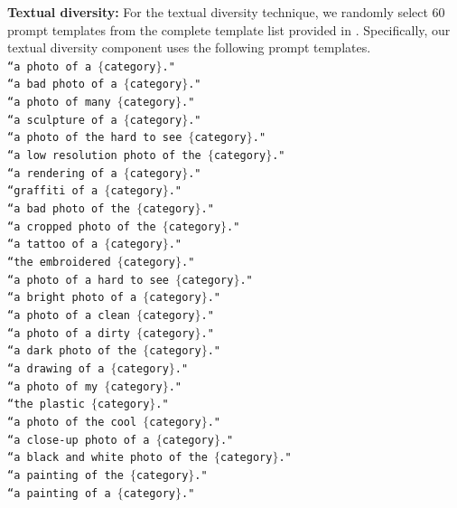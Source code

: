 \documentclass[10pt,twocolumn,letterpaper]{article}
\begin{document}
\noindent \textbf{Textual diversity:}
For the textual diversity technique, we randomly select 60 prompt templates from the complete template list provided in \cite{radford2021learning}. Specifically, our textual diversity component uses the following prompt templates. \\  {
    \texttt{``a photo of a $\{$category$\}$."}\\
    \texttt{``a bad photo of a $\{$category$\}$."}\\
    \texttt{``a photo of many $\{$category$\}$."}\\
    \texttt{``a sculpture of a $\{$category$\}$."}\\
    \texttt{``a photo of the hard to see $\{$category$\}$."}\\
    \texttt{``a low resolution photo of the $\{$category$\}$."}\\
    \texttt{``a rendering of a $\{$category$\}$."}\\
    \texttt{``graffiti of a $\{$category$\}$."}\\
    \texttt{``a bad photo of the $\{$category$\}$."}\\
    \texttt{``a cropped photo of the $\{$category$\}$."}\\
    \texttt{``a tattoo of a $\{$category$\}$."}\\
    \texttt{``the embroidered $\{$category$\}$."}\\
    \texttt{``a photo of a hard to see $\{$category$\}$."}\\
    \texttt{``a bright photo of a $\{$category$\}$."}\\
    \texttt{``a photo of a clean $\{$category$\}$."}\\
    \texttt{``a photo of a dirty $\{$category$\}$."}\\
    \texttt{``a dark photo of the $\{$category$\}$."}\\
    \texttt{``a drawing of a $\{$category$\}$."}\\
    \texttt{``a photo of my $\{$category$\}$."}\\
    \texttt{``the plastic $\{$category$\}$."}\\
    \texttt{``a photo of the cool $\{$category$\}$."}\\
    \texttt{``a close-up photo of a $\{$category$\}$."}\\
    \texttt{``a black and white photo of the $\{$category$\}$."}\\
    \texttt{``a painting of the $\{$category$\}$."}\\
    \texttt{``a painting of a $\{$category$\}$."}\\
}
\end{document}

